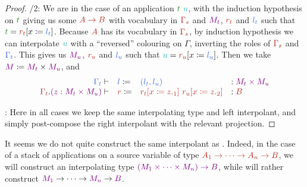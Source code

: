 \documentclass[10pt,a4paper]{notes-template}
\begin{document}
\begin{proof}
  /2: We are in the case of an application
  \(\icol{t}~\ccol{u}\), with the induction hypothesis on \(\icol{t}\) giving
  us some \(\scol{A \to B}\) with vocabulary in \(\scol{\Gamma_s}\) and
  \(\mcol{M_t}\), \(\scol{r_t}\) and \(\tcol{l_t}\) such that
  \(\icol{t} = \subs{\scol{r_t}}{x}{\tcol{l_t}}\). Because \(\scol{A}\) has its
  vocabulary in \(\scol{\Gamma_s}\), by induction hypothesis we can
  interpolate \(\ccol{u}\) with a “reversed” colouring on \(\Gamma\),
  \ie inverting the roles of \(\scol{\Gamma_s}\) and \(\tcol{\Gamma_t}\).
  This gives us \(\mcol{M_u}\), \(\scol{r_u}\) and \(\tcol{l_u}\) such that
  \(\ccol{u} = \subs{\scol{r_u}}{x}{\tcol{l_u}}\). Then we take
  \(\mcol{M} \coloneq \mcol{M_t} \times \mcol{M_u}\), and
  \[\begin{array}{rlll}
      \tcol{\Gamma_{t}} \vdash & \tcol{l} \coloneq & \tcol{(l_t,l_u)} &
        \ty \mcol{M_t \times M_u} \\
      \scol{\Gamma_{t}}.\mcol{(z : M_t \times M_u)} \vdash & \scol{r} \coloneq &
        \scol{\subs{r_t}{x}{\proj{1}{z}}~\subs{r_u}{x}{\proj{2}{z}}} & \ty \scol{B}
  \end{array}\]

  : Here in all cases we keep the same interpolating type
    and left interpolant, and simply post-compose the right interpolant with
    the relevant projection.
    
\end{proof}

It seems we do not quite construct the same interpolant as \citeauthor{Cubric1994}.
Indeed, in the case of a stack of applications on a source variable of type
\(\scol{A_1 \to \dots \to A_n \to B}\), we will construct an interpolating type
\(\mcol{(M_1 \times \dots \times M_n) \to B}\), while \citeauthor{Cubric1994} will
rather construct \(\mcol{M_1} \to \dots \to \mcol{M_n} \to \mcol{B}\).

\printbibliography
\end{document}
